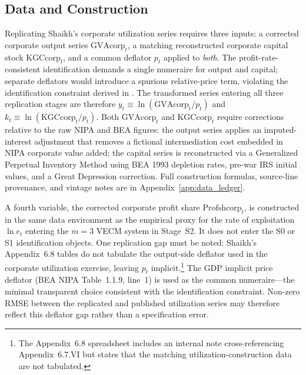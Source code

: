 \documentclass[11pt,a4paper]{article}
\begin{document}

\subsection{Data and Construction}
\label{sec:ch3_data}

Replicating Shaikh's corporate utilization series requires three inputs: a
corrected corporate output series $\text{GVAcorp}_t$, a matching
reconstructed corporate capital stock $\text{KGCcorp}_t$, and a common
deflator $p_t$ applied to \emph{both}. The profit-rate-consistent
identification demands a single numeraire for output and capital; separate
deflators would introduce a spurious relative-price term, violating the
identification constraint derived in \citet[Appendix~6.6]{Shaikh2016}. The
transformed series entering all three replication stages are therefore
$y_t \equiv \ln(\text{GVAcorp}_t / p_t)$ and $k_t \equiv \ln(\text{KGCcorp}_t
/ p_t)$. Both $\text{GVAcorp}_t$ and $\text{KGCcorp}_t$ require corrections
relative to the raw NIPA and BEA figures: the output series applies an
imputed-interest adjustment that removes a fictional intermediation cost
embedded in NIPA corporate value added; the capital series is reconstructed
via a Generalized Perpetual Inventory Method using BEA 1993 depletion rates,
pre-war IRS initial values, and a Great Depression correction. Full
construction formulas, source-line provenance, and vintage notes are in
Appendix~\ref{app:data_ledger}.

A fourth variable, the corrected corporate profit share
$\text{Profshcorp}_t$, is constructed in the same data environment as the
empirical proxy for the rate of exploitation $\ln e_t$ entering the $m=3$
VECM system in Stage~S2. It does not enter the S0 or S1 identification
objects. One replication gap must be noted: Shaikh's Appendix~6.8 tables do
not tabulate the output-side deflator used in the corporate utilization
exercise, leaving $p_t$ implicit.\footnote{The Appendix~6.8 spreadsheet
	includes an internal note cross-referencing Appendix~6.7.VI but states that
	the matching utilization-construction data are not tabulated.} The GDP
implicit price deflator (BEA NIPA Table~1.1.9, line~1) is used as the
common numeraire---the minimal transparent choice consistent with the
identification constraint. Non-zero RMSE between the replicated and
published utilization series may therefore reflect this deflator gap rather
than a specification error.
\end{document}
